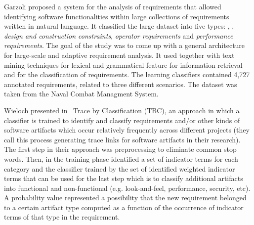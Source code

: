 Garzoli \cite {Garzoli:2013} proposed a system for the analysis of requirements
that allowed identifying software functionalities within large collections of
requirements written in natural language. It classified the large dataset into
five types: \FRs, \NFRs, \emph{design and construction constraints},
\emph{operator requirements} and \emph{performance requirements}.  The goal of
the study was to come up with a general architecture for large-scale and
adaptive requirement analysis. It used \BOW together with text mining techniques
for lexical and grammatical feature for information retrieval and \SVM for the
classification of requirements. The learning classifiers contained 4,727
annotated requirements, related to three different scenarios. The dataset was
taken from the Naval Combat Managment System.

Wieloch \etal presented in~\cite{Wieloch:2013} Trace by Classification (TBC), an
\ML approach in which a classifier is trained to identify and classify requirements
and/or other kinds of software artifacts which occur relatively frequently
across different projects (they call this process generating trace links for
software artifacts in their research).
The first step in their approach was preprocessing to eliminate common stop
words. Then, in the training phase identified a set of indicator
terms for each \NFR category and the classifier trained by the
set of identified weighted indicator terms that can be used for the last step
which is to classify additional artifacts into functional and non-functional
(e.g. look-and-feel, performance, security, etc). A probability value
represented a possibility that the new requirement belonged to a certain
artifact type computed as a function of the occurrence of indicator terms of
that type in the requirement. 
 

